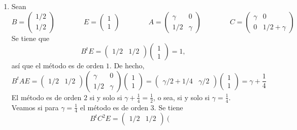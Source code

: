\documentclass[11pt]{report}
\begin{document}
\begin{enumerate}
  \item Sean
  \[B = \left(\begin{array}{c}
    1/2 \\
    1/2
  \end{array}\right) \qquad \qquad E = \left(\begin{array}{c}
    1 \\
    1
  \end{array}\right) \qquad \qquad A = \left(\begin{array}{cc}
    \gamma & 0 \\
    1/2 & \gamma
  \end{array}\right) \qquad \qquad C = \left(\begin{array}{cc}
    \gamma & 0 \\
    0 & 1/2+\gamma
  \end{array}\right)\]
  Se tiene que
  \[B^tE = \left(\begin{array}{cc}
    1/2 & 1/2
  \end{array}\right)\left(\begin{array}{c}
    1 \\
    1
  \end{array}\right) = 1,\]
  así que el método es de orden $1$. De hecho,
  \[B^tAE = \left(\begin{array}{cc}
    1/2 & 1/2
  \end{array}\right)\left(\begin{array}{cc}
    \gamma & 0 \\
    1/2 & \gamma
  \end{array}\right)\left(\begin{array}{c}
    1 \\
    1
  \end{array}\right) = \left(\begin{array}{cc}
    \gamma/2+1/4 & \gamma/2
  \end{array}\right)\left(\begin{array}{c}
    1 \\
    1
  \end{array}\right) = \gamma +\frac{1}{4}\]
  El método es de orden $2$ si y solo si $\gamma +\frac{1}{4}=\frac{1}{2}$, o sea, si y solo si $\gamma = \frac{1}{4}$. Veamos si para $\gamma=\frac{1}{4}$ el método es de orden 3. Se tiene
  \[B^tC^2E = \left(\begin{array}{cc}
    1/2 & 1/2
  \end{array}\right)\left(\begin{array}{cc}

\end{array}\]
\end{enumerate}
\end{document}
